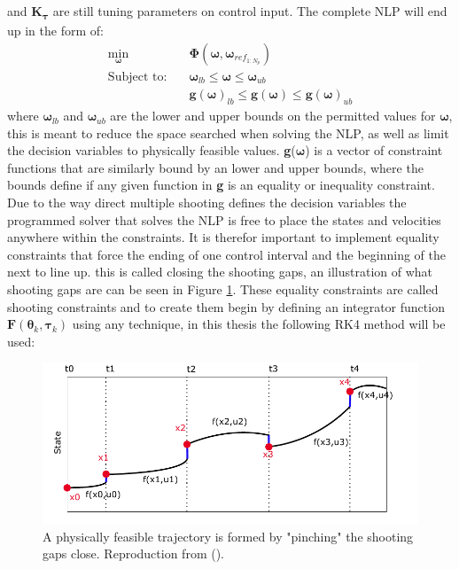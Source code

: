 and \textbf{K}\textsubscript{$\bm{\tau}$} are still tuning parameters on control input. The complete NLP will end up in the form of:
\begin{subequations}
    \label{EQ:NLP}
    \begin{align}
        \min_{\bm{\omega}} \quad & \bm{\Phi}(\bm{\omega}, \bm{\omega}_{ref_{1:N_p}}) \\ %
        \textrm{Subject to:} \quad & \bm{\omega}_{lb} \leq \bm{\omega} \leq \bm{\omega}_{ub} \\
                            \quad & \textbf{g}(\bm{\omega})_{lb} \leq \textbf{g}(\bm{\omega}) \leq \textbf{g}(\bm{\omega})_{ub}
    \end{align}
\end{subequations}
where $\bm{\omega}_{lb}$ and $\bm{\omega}_{ub}$ are the lower and upper bounds on the permitted values for $\bm{\omega}$, this is meant to reduce the space searched when
solving the NLP, as well as limit the decision variables to physically feasible values. \textbf{g}($\bm{\omega}$) is a vector of constraint functions that are similarly bound
by an lower and upper bounds, where the bounds define if any given function in \textbf{g} is an equality or inequality constraint. Due to the way direct multiple shooting
defines the decision variables the programmed solver that solves the \gls{NLP} is free to place the states and velocities anywhere within the constraints. It is therefor
important to implement equality constraints that force the ending of one control interval and the beginning of the next to line up. this is called closing the shooting gaps, 
an illustration of what shooting gaps are can be seen in Figure \ref{FIG: Shooting Gaps}. These equality constraints are called shooting constraints and to create them begin
by defining an integrator function $\textbf{F}(\bm{\theta}_{k}, \bm{\tau}_k)$ using any technique, in this thesis the following \gls{RK4} method will be used:

\begin{figure}
    \includegraphics[width=\textwidth]{Images/MultipleShooting.pdf}
    \caption{A physically feasible trajectory is formed by "pinching" the shooting gaps close. Reproduction from (\cite{gros2017Lecture}).}
    \label{FIG: Shooting Gaps}
\end{figure}

